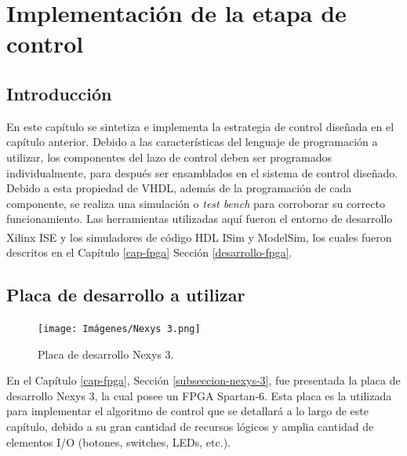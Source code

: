 \chapter{Implementación de la etapa de control}
\label{implementacion-control}

\section{Introducción}

En este capítulo se sintetiza e implementa la estrategia de control diseñada en el capítulo anterior. Debido a las características del lenguaje de programación a utilizar, los componentes del lazo de control deben ser programados individualmente, para después ser ensamblados en el sistema de control diseñado. Debido a esta propiedad de VHDL, además de la programación de cada componente, se realiza una simulación o \emph{test bench} para corroborar su correcto funcionamiento. Las herramientas utilizadas aquí fueron el entorno de desarrollo Xilinx ISE\textsuperscript\textregistered \hspace{0.6pt} y los simuladores de código HDL ISim\textsuperscript\textregistered \hspace{0.6pt} y ModelSim\textsuperscript\textregistered \hspace{0.6pt}, los cuales fueron descritos en el Capítulo \ref{cap-fpga} Sección \ref{desarrollo-fpga}.

\section{Placa de desarrollo a utilizar}

\begin{figure}
    \vspace{-10pt}
    \begin{center}
      \texttt{[image: Imágenes/Nexys 3.png]}
    \end{center}
    \caption{Placa de desarrollo Nexys 3.}
    \label{nexys3}
  \end{figure}

En el Capítulo \ref{cap-fpga}, Sección \ref{subseccion-nexys-3}, fue presentada la placa de desarrollo Nexys 3, la cual posee un FPGA Spartan-6. Esta placa es la utilizada para implementar el algoritmo de control que se detallará a lo largo de este capítulo, debido a su gran cantidad de recursos lógicos y amplia cantidad de elementos I/O (botones, switches, LEDs, etc.).


